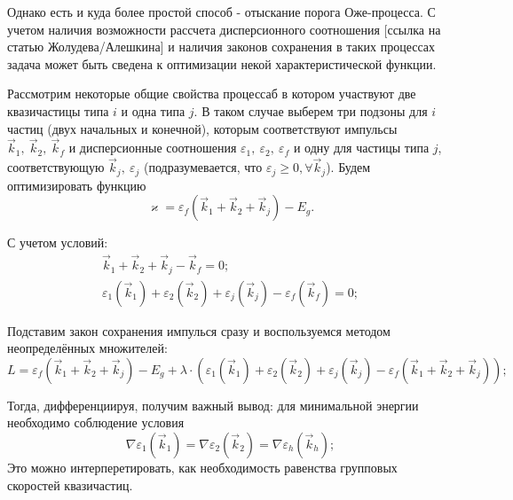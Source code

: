         Однако есть и куда более простой способ - отыскание порога Оже-процесса.
        С учетом наличия возможности рассчета дисперсионного соотношения 
        [ссылка на статью Жолудева/Алешкина] и наличия законов сохранения в таких
        процессах задача может быть сведена к оптимизации некой характеристической
        функции.

        Рассмотрим некоторые общие свойства процессаб в котором участвуют две
        квазичастицы типа $i$ и одна типа $j$. В таком случае выберем три подзоны для 
        $i$ частиц (двух начальных и конечной), которым соответствуют импульсы 
        $\vec{k}_1,~\vec{k}_2,~\vec{k}_f$ и дисперсионные 
        соотношения $\varepsilon_1,~\varepsilon_2,~\varepsilon_f$ и одну для частицы типа $j$,
        соответствующую $\vec{k}_j,~\varepsilon_j$ (подразумевается, что 
        $\varepsilon_j \geq 0, \forall \vec{k}_j$). Будем оптимизировать функцию 
        \begin{equation}
            \varkappa = \varepsilon_f(\vec{k}_1 + \vec{k}_2 + \vec{k}_j) - E_g.
        \end{equation}

        С учетом условий:
        \begin{eqnarray}
            \vec{k}_1 + \vec{k}_2 + \vec{k}_j - \vec{k}_f = 0;\\
            \varepsilon_1(\vec{k}_1) + \varepsilon_2(\vec{k}_2) + \varepsilon_j(\vec{k}_j) - \varepsilon_f(\vec{k}_f) = 0;
        \end{eqnarray}

        Подставим закон сохранения импулься сразу и воспользуемся методом неопределённых множителей:
        \begin{equation}
            L = \varepsilon_f(\vec{k}_1 + \vec{k}_2 + \vec{k}_j) - E_g + \lambda \cdot \left(\varepsilon_1(\vec{k}_1) + 
            \varepsilon_2(\vec{k}_2) + \varepsilon_j(\vec{k}_j) - \varepsilon_f(\vec{k}_1 + \vec{k}_2 + \vec{k}_j)\right);
        \end{equation}

        Тогда, дифференциируя, получим важный  вывод: для минимальной энергии необходимо соблюдение условия
        \begin{equation}
            \nabla \varepsilon_1(\vec{k}_1) = \nabla \varepsilon_2(\vec{k}_2) = \nabla \varepsilon_h(\vec{k}_h);
        \end{equation}
        Это можно интерперетировать, как необходимость равенства групповых скоростей квазичастиц.
        
